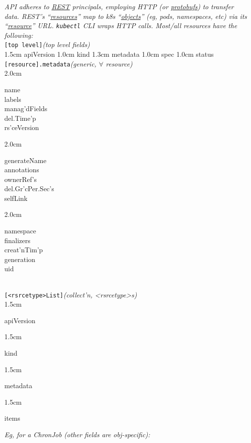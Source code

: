 {\footnotesize \textit{API adheres to \href{https://en.wikipedia.org/wiki/Representational\_state\_transfer}{REST} principals, employing HTTP (or \href{https://developers.google.com/protocol-buffers}{protobufs}) to transfer data. REST's ``\href{https://martinfowler.com/articles/richardsonMaturityModel.html\#level1}{resources}'' map to k8s ``\href{https://kubernetes.io/docs/concepts/overview/working-with-objects/kubernetes-objects/\#kubernetes-objects}{objects}'' (eg, pods, namespaces, etc) via its ``\href{https://stackoverflow.com/questions/52309496/difference-between-kubernetes-objects-and-resources}{resource}'' URL. {\tt kubectl} CLI wraps HTTP calls. Most/all resources have the following:}}\\
\texttt{[top level]}\quad\textit{(top level fields)}\\[-2mm]
\api
{1.5cm}{
apiVersion  
}
{1.0cm}{
kind        
}
{1.3cm}{
metadata
}
{1.0cm}{
spec
}
{1.0cm}{
status
}
\stopapi
\\
\texttt{[resource].metadata}\quad\textit{(generic, $\forall$ resource)}\\[-2mm]
\api
{2.0cm}{
name        \\
labels      \\
manag'dFields\\
del.Time'p  \\
rs'ceVersion

}
{2.0cm}{
generateName    \\
annotations     \\
ownerRef's      \\
del.Gr'cPer.Sec's\\
selfLink        

}
{2.0cm}{
namespace   \\
finalizers  \\
creat'nTim'p\\
generation  \\
uid

}
\stopapi
\\
\texttt{[<rsrcetype>List]}\quad\textit{(collect'n, <rsrcetype>s)}\\[-2mm]
\api
{1.5cm}{
apiVersion

}
{1.5cm}{
kind

}
{1.5cm}{
metadata

}
{1.5cm}{
items

}
\stopapi

\textit{Eg, for a ChronJob (other fields are obj-specific):}\\
 \\


